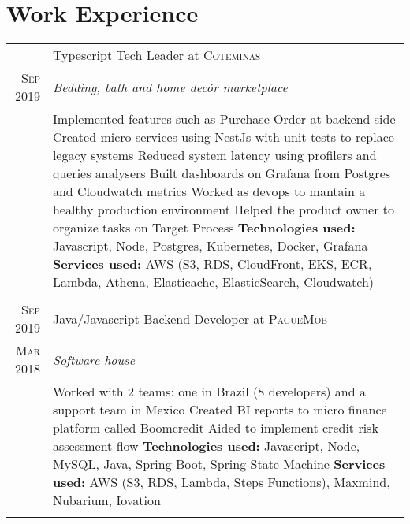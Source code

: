 \documentclass[a4paper,10pt]{article}
\begin{document}
\section{Work Experience}
\begin{tabular}{r|p{11cm}}

\textsc{ } & Typescript Tech Leader at \textsc{Coteminas} \\\textsc{Sep 2019}&\emph{Bedding, bath and home decór marketplace }\\&\footnotesize{ 
  Implemented features such as Purchase Order at backend side \newline
  Created micro services using NestJs with unit tests to replace legacy systems \newline
  Reduced system latency using profilers and queries analysers \newline
  Built dashboards on Grafana from Postgres and Cloudwatch metrics \newline
  Worked as devops to mantain a healthy production environment \newline
  Helped the product owner to organize tasks on Target Process \newline
\textbf{Technologies used:} Javascript, Node, Postgres, Kubernetes, Docker, Grafana \newline
\textbf{Services used:} AWS (S3, RDS, CloudFront, EKS, ECR, Lambda, Athena, Elasticache, ElasticSearch, Cloudwatch)}\\\multicolumn{2}{c}{} \\


 \textsc{ Sep 2019 } & Java/Javascript Backend Developer at \textsc{PagueMob} \\\textsc{Mar 2018}&\emph{Software house }\\&\footnotesize{
  Worked with 2 teams: one in Brazil (8 developers) and a support team in Mexico \newline
  Created BI reports to micro finance platform called Boomcredit \newline
  Aided to implement credit risk assessment flow \newline
\textbf{Technologies used:} Javascript, Node, MySQL, Java, Spring Boot, Spring State Machine\newline
\textbf{Services used:} AWS (S3, RDS, Lambda, Steps Functions), Maxmind, Nubarium, Iovation }\\\multicolumn{2}{c}{} \\


\end{tabular}
\end{document}
